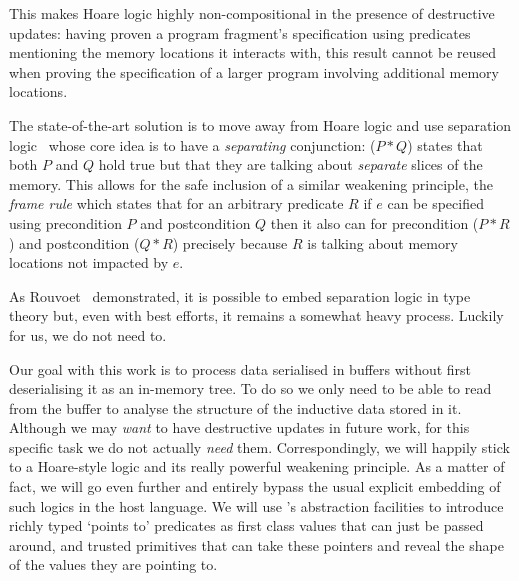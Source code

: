 This makes Hoare logic highly non-compositional in the presence of
destructive updates: having proven a program
fragment's specification using predicates mentioning the memory locations
it interacts with, this result cannot be reused when proving the specification
of a larger program involving additional memory locations.

The state-of-the-art solution is to move away from Hoare logic and use
separation logic~\citep{DBLP:conf/lics/Reynolds02,DBLP:journals/cacm/OHearn19,DBLP:books/hal/Chargueraud23,MANUAL:book/sfoundations/Chargueraud23}
whose core idea is to have a \emph{separating} conjunction: ($P \ast Q$)
states that both $P$ and $Q$ hold true but that they are talking about
\emph{separate} slices of the memory.
%
This allows for the safe inclusion of a similar weakening principle,
the \emph{frame rule} which states that for an arbitrary predicate $R$
if $e$ can be specified using precondition $P$ and postcondition $Q$
then it also can for precondition ($P \ast R$) and postcondition ($Q \ast R$)
precisely because $R$ is talking about memory locations not impacted by $e$.

As Rouvoet~\citeyearpar{DBLP:phd/basesearch/Rouvoet21}
demonstrated, it is possible to embed separation logic in
type theory but, even with best efforts, it remains a somewhat
heavy process. Luckily for us, we do not need to.

Our goal with this work is to process data serialised in buffers
without first deserialising it as an in-memory tree.
To do so we only need to be able to read from the buffer to
analyse the structure of the inductive data stored in it.
%
Although we may \emph{want} to have destructive updates in future
work, for this specific task we do not actually \emph{need} them.
%
Correspondingly, we will happily stick to a Hoare-style logic and
its really powerful weakening principle.
%
As a matter of fact, we will go even further and entirely bypass the
usual explicit embedding of such logics in the host language.
%
We will use \idris{}'s abstraction facilities to introduce richly typed
`points to' predicates as first class values that can just be passed
around, and trusted primitives that can take these pointers and reveal
the shape of the values they are pointing to.
